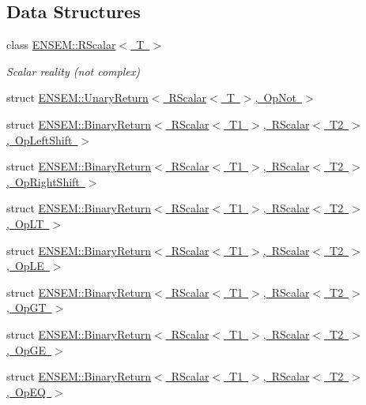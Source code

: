 \subsection*{Data Structures}
\begin{DoxyCompactItemize}
\item 
class \mbox{\hyperlink{classENSEM_1_1RScalar}{E\+N\+S\+E\+M\+::\+R\+Scalar$<$ T $>$}}
\begin{DoxyCompactList}\small\item\em Scalar reality (not complex) \end{DoxyCompactList}\item 
struct \mbox{\hyperlink{structENSEM_1_1UnaryReturn_3_01RScalar_3_01T_01_4_00_01OpNot_01_4}{E\+N\+S\+E\+M\+::\+Unary\+Return$<$ R\+Scalar$<$ T $>$, Op\+Not $>$}}
\item 
struct \mbox{\hyperlink{structENSEM_1_1BinaryReturn_3_01RScalar_3_01T1_01_4_00_01RScalar_3_01T2_01_4_00_01OpLeftShift_01_4}{E\+N\+S\+E\+M\+::\+Binary\+Return$<$ R\+Scalar$<$ T1 $>$, R\+Scalar$<$ T2 $>$, Op\+Left\+Shift $>$}}
\item 
struct \mbox{\hyperlink{structENSEM_1_1BinaryReturn_3_01RScalar_3_01T1_01_4_00_01RScalar_3_01T2_01_4_00_01OpRightShift_01_4}{E\+N\+S\+E\+M\+::\+Binary\+Return$<$ R\+Scalar$<$ T1 $>$, R\+Scalar$<$ T2 $>$, Op\+Right\+Shift $>$}}
\item 
struct \mbox{\hyperlink{structENSEM_1_1BinaryReturn_3_01RScalar_3_01T1_01_4_00_01RScalar_3_01T2_01_4_00_01OpLT_01_4}{E\+N\+S\+E\+M\+::\+Binary\+Return$<$ R\+Scalar$<$ T1 $>$, R\+Scalar$<$ T2 $>$, Op\+L\+T $>$}}
\item 
struct \mbox{\hyperlink{structENSEM_1_1BinaryReturn_3_01RScalar_3_01T1_01_4_00_01RScalar_3_01T2_01_4_00_01OpLE_01_4}{E\+N\+S\+E\+M\+::\+Binary\+Return$<$ R\+Scalar$<$ T1 $>$, R\+Scalar$<$ T2 $>$, Op\+L\+E $>$}}
\item 
struct \mbox{\hyperlink{structENSEM_1_1BinaryReturn_3_01RScalar_3_01T1_01_4_00_01RScalar_3_01T2_01_4_00_01OpGT_01_4}{E\+N\+S\+E\+M\+::\+Binary\+Return$<$ R\+Scalar$<$ T1 $>$, R\+Scalar$<$ T2 $>$, Op\+G\+T $>$}}
\item 
struct \mbox{\hyperlink{structENSEM_1_1BinaryReturn_3_01RScalar_3_01T1_01_4_00_01RScalar_3_01T2_01_4_00_01OpGE_01_4}{E\+N\+S\+E\+M\+::\+Binary\+Return$<$ R\+Scalar$<$ T1 $>$, R\+Scalar$<$ T2 $>$, Op\+G\+E $>$}}
\item 
struct \mbox{\hyperlink{structENSEM_1_1BinaryReturn_3_01RScalar_3_01T1_01_4_00_01RScalar_3_01T2_01_4_00_01OpEQ_01_4}{E\+N\+S\+E\+M\+::\+Binary\+Return$<$ R\+Scalar$<$ T1 $>$, R\+Scalar$<$ T2 $>$, Op\+E\+Q $>$}}

\end{DoxyCompactItemize}

